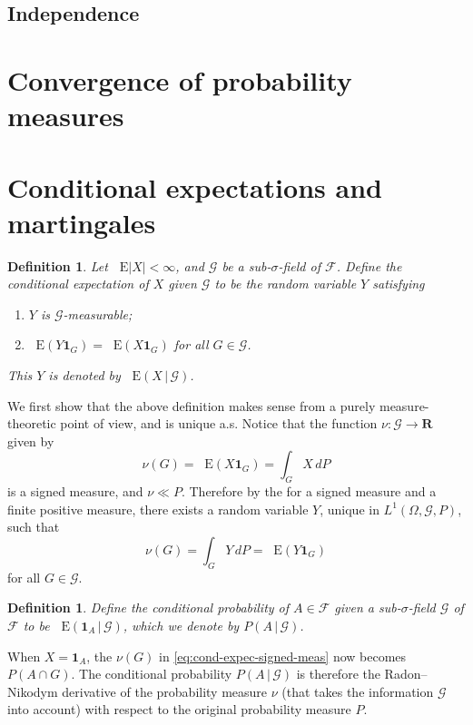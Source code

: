 \documentclass[10pt]{article}
\numberwithin{equation}{section}
\theoremstyle{plain-star}
\theoremstyle{definition-star}
\newtheorem{defn}[equation]{Definition}
\theoremstyle{remark-star}
\theoremstyle{plain-star}
\newcommand{\R}{\mathbf{R}}
\newcommand{\ind}{\mathbf{1}}
\newcommand{\E}{\mathop{}\!\mathrm{E}}
\newcommand{\giv}{\,|\,}
\newcommand{\F}{\mathcal{F}}
\newcommand{\G}{\mathcal{G}}
\newcommand{\abs}[1]{\lvert #1 \rvert}
\newcommand{\df}[1]{\textit{#1}}
\begin{document}
\subsection{Independence}

\section{Convergence of probability measures}

\section{Conditional expectations and martingales}
\begin{defn}
    Let $\E \abs{X} < \infty$, and $\G$ be a sub-$\sigma$-field of $\F$. Define the \df{conditional expectation of $X$ given $\G$} to be the random variable $Y$ satisfying \begin{enumerate}
        \item $Y$ is $\G$-measurable; 
        \item $\E(Y \ind_{G}) = \E(X \ind_G)$ for all $G \in \G$.
    \end{enumerate}
    This $Y$ is denoted by $\E(X \giv \G)$.
\end{defn}

We first show that the above definition makes sense from a purely measure-theoretic point of view, and is unique a.s.
Notice that the function $\nu\colon \mathcal{G} \to \R$ given by \begin{equation} \label{eq:cond-expec-signed-meas}
    \nu(G) = \E(X\ind_G) = \int_G X \,dP
\end{equation} is a signed measure, and $\nu \ll P$. Therefore by the  for a signed measure and a finite positive measure, there exists a random variable $Y$, unique in $L^1(\Omega,\G,P)$, such that \[
    \nu(G) = \int_G Y \,dP = \E(Y\ind_G)
\] for all $G\in \G$.


\begin{defn}
    Define the conditional probability of $A \in \F$ given a sub-$\sigma$-field $\G$ of $\F$ to be $\E(\ind_A \giv \G)$, which we denote by $P(A\giv \G)$.
\end{defn}

When $X = \ind_A$, the $\nu(G)$ in \eqref{eq:cond-expec-signed-meas} now becomes $P(A\cap G)$. The conditional probability $P(A \giv \G)$ is therefore the Radon--Nikodym derivative of the probability measure $\nu$ (that takes the information $\G$ into account) with respect to the original probability measure $P$.

\newpage
\printbibliography
\end{document}
